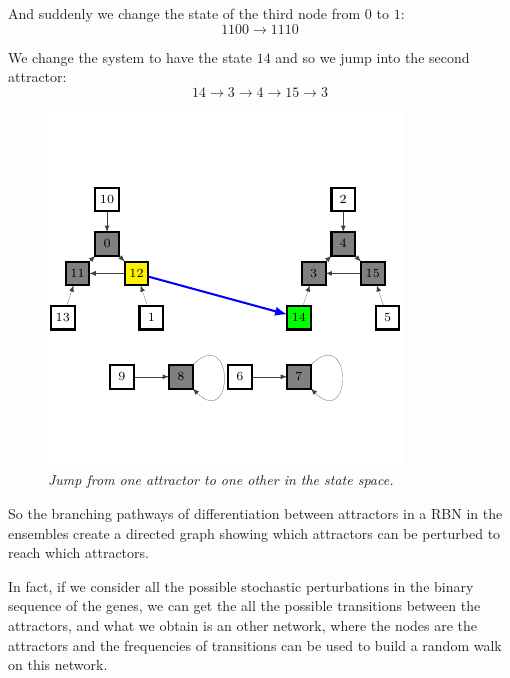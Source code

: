 And suddenly we change the state of the third node from $0$ to $1$:
$$
1100 \to 1110
$$

We change the system to have the state $14$ and so we jump into the second attractor:
$$
14 \to 3 \to 4 \to 15 \to 3
$$
\begin{figure}[h]
\centering
\includegraphics[scale=1.4]{fg4.pdf}
\caption{\emph{Jump from one attractor to one other in the state space.}}
\label{fig:rb4}
\end{figure}

So the branching pathways of differentiation between
attractors in a RBN in the ensembles create a directed
graph showing which attractors can be perturbed to
reach which attractors.

In fact, if we consider all the possible stochastic perturbations in the binary sequence of the genes, we can get the all the possible transitions between the attractors, and what we obtain is an other network, where the nodes are the attractors and the frequencies of transitions can be used to build a random walk on this network\cite{K2}.


